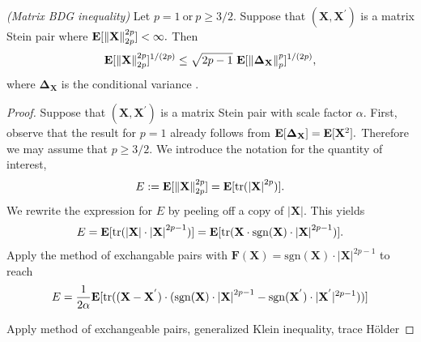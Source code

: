 \begin{theorem}
  \emph{(Matrix BDG inequality)}
  Let
  $
    p = 1
    \ 
    \text{or}\ 
    p \ge 3/2
    .
  $
  Suppose that 
  $
  (
    \mathbf{X}
   , 
   \mathbf{X}^{'}
  )
  $
  is a matrix Stein pair where
  $
   \mathbf{E}
   [ 
    \left\lVert\mathbf{X}\right\rVert
    _{2p}^{2p}
   ]
   <
   \infty
   .
  $
  Then
  \begin{gather}
   \E
   [ 
    \norm{\mathbf{X}}
    _{2p}^{2p}
   ]
   ^{1/(2p)}
   \le
   \sqrt{2p - 1}
   \ 
   \E
   [ 
    \norm{\mathbf{\Delta_X}}
    _{p}^{p}
   ]
   ^{1/(2p)}
   ,
  \end{gather}
  where 
  $
    \mathbf{\Delta_X}
  $
  is the conditional variance
  .
\end{theorem}
\begin{proof}
  \emph{\cite[§7.3]{Mackey2014}}
  Suppose that
  $
  (
    \mathbf{X}
    ,
    \mathbf{X}^{'}
  )
  $
  is a matrix Stein pair with scale factor $\alpha.$
  First, observe that the result for $p=1$ already follows from 
  $
    \mathbf{E}[\mathbf{\Delta_X}]
    =
    \mathbf{E}[\mathbf{X}^2]
    .
  $
  Therefore we may assume that $p\ge 3/2.$
  We introduce the notation for the quantity of interest,
  \begin{gather}
    E
    :=
    \mathbf{E}[
    \left\lVert\mathbf{X}\right\rVert_{2p}^{2p}
    ]
    =
    \mathbf{E}
    [
    \mathrm{tr}
    (
    \left| \mathbf{X} \right|^{2p}
    )
    ].
  \end{gather}
  We rewrite the expression for $E$
  by peeling off a copy of $\left| \mathbf{X} \right|.$
  This yields
  \begin{gather}
    E
    =
    \mathbf{E}
    [
    \mathrm{tr}
    (
    \left| \mathbf{X} \right|
    \cdot
    \left| \mathbf{X} \right|^{2p-1}
    )
    ]
    =
    \mathbf{E}
    [
    \mathrm{tr}
    (
    \mathbf{X}
    \cdot
    \mathrm{sgn}
    (
      \mathbf{X}
    )
    \cdot
    \left| \mathbf{X} \right|^{2p-1}
    )
    ]
    .
  \end{gather}
  Apply the method of exchangable pairs with 
  $
    \mathbf{F}
    (\mathbf{X})
    =
    \mathrm{sgn}
    (\mathbf{X})
    \cdot
    \left| \mathbf{X} \right|^{2p-1}
  $
  to reach
  \begin{gather}
    E
    =
    \frac{1}{2\alpha}
    \mathbf{E}
    [
    \mathrm{tr}
    (
    (
    \mathbf{X}
    -
    \mathbf{X}^{'}
    )
    \cdot
    (
    \mathrm{sgn}
    (
      \mathbf{X}
    )
    \cdot
    \left| \mathbf{X} \right|^{2p-1}
    -
    \mathrm{sgn}
    (
    \mathbf{X}^{'}
    )
    \cdot
    | \mathbf{X}^{'} |^{2p-1}
    )
    )
    ]
  \end{gather}



  Apply method of exchangeable pairs,
  generalized Klein inequality,
  trace Hölder
\end{proof}




